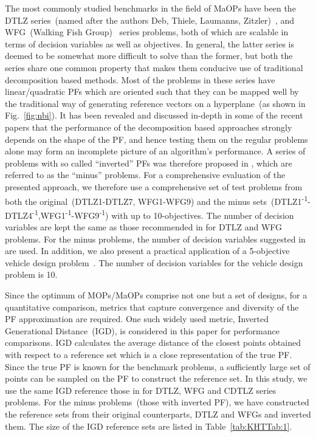 \documentclass[twocolumn,10pt]{asme2ej}
\begin{document}
The most commonly studied benchmarks in the field of MaOPs have been the DTLZ series~(named after the authors Deb, Thiele, Laumanns, Zitzler)~\cite{KHTdeb2005scalable}, and WFG~(Walking Fish Group)~\cite{KHTwfg2006huband} series problems, both of which are scalable in terms of decision variables as well as objectives. In general, the latter series is deemed to be somewhat more difficult to solve than the former, but both the series share one common property that makes them conducive use of traditional decomposition based methods. Most of the problems in these series have linear/quadratic PFs which are oriented such that they can be mapped well by the traditional way of generating reference vectors on a hyperplane~(as shown in Fig.~\ref{fig:nbi}). It has been revealed and discussed in-depth in some of the recent papers\cite{asaf2017enhanced,KHTishibuchi2016inverse} that the performance of the decomposition based approaches strongly depends on the shape of the PF, and hence testing them on the regular problems alone may form an incomplete picture of an algorithm's performance. A series of problems with so called ``inverted'' PFs was therefore proposed in  \cite{KHTishibuchi2016inverse}, which are referred to as the ``minus'' problems. For a comprehensive evaluation of the presented approach, we therefore use a comprehensive set of test problems from both the original~(DTLZ1-DTLZ7, WFG1-WFG9) and the minus sets~(DTLZ1\textsuperscript{-1}-DTLZ4\textsuperscript{-1},WFG1\textsuperscript{-1}-WFG9\textsuperscript{-1}) with up to 10-objectives. The number of decision variables are kept the same as those recommended in \cite{KHTchugh2016krvea} for DTLZ and WFG problems. For the minus problems, the number of decision variables suggested in \cite{KHTishibuchi2016inverse} are used.  In addition, we also present a practical application of a 5-objective {\color{blue}vehicle design} problem~\cite{KHTbarnum2010car}. The number of decision variables for the {\color{blue}vehicle design} problem is 10.

Since the optimum of MOPs/MaOPs comprise not one but a set of designs, for a quantitative comparison, metrics that capture convergence and diversity of the PF approximation are required. One such widely used metric, Inverted Generational Distance~(IGD), is considered in this paper for performance comparisons. IGD calculates the average distance of the closest points obtained with respect to a reference set which is a close representation of the true PF. Since the true PF is known for the benchmark problems, a sufficiently large set of points can be sampled on the PF to construct the reference set. In this study, we use the same IGD reference those in \cite{KHTchugh2016krvea,KHTchugh2016const} for DTLZ, WFG and CDTLZ series problems. For the minus problems~(those with inverted PF), we have constructed the reference sets from their original counterparts, DTLZ and WFGs and inverted them. The size of the IGD reference sets are listed in Table~\ref{tab:KHTTab:1}. 
\end{document}
